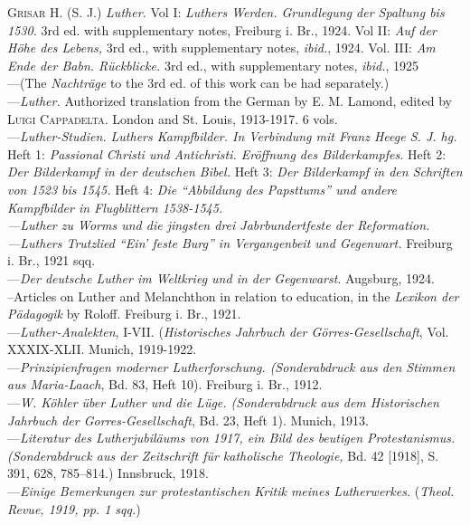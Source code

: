 \textsc{Grisar H.} (S. J.) \textit{Luther.} Vol I: \textit{Luthers Werden. Grundlegung der Spaltung
bis 1530.} 3rd ed. with supplementary notes, Freiburg i. Br., 1924. Vol II:
\textit{Auf der Höhe des Lebens,} 3rd ed., with supplementary notes, \textit{ibid.}, 1924.
Vol. III: \textit{Am Ende der Babn. Rückblicke.} 3rd ed., with supplementary
notes, \textit{ibid.}, 1925 \\
---(The \textit{Nachträge} to the 3rd ed. of this work can be
had separately.) \\
---\textit{Luther.} Authorized translation from the German by E. M. Lamond,
edited by \textsc{Luigi Cappadelta}. London and St. Louis, 1913-1917. 6 vols. \\
---\textit{Luther-Studien. Luthers Kampfbilder. In Verbindung mit Franz Heege
S. J. hg.} \\
Heft 1: \textit{Passional Christi und Antichristi. Eröffnung des Bilderkampfes.}
Heft 2: \textit{Der Bilderkampf in der deutschen Bibel.}
Heft 3: \textit{Der Bilderkampf in den Schriften von 1523 bis 1545.}
Heft 4: \textit{Die “Abbildung des Papsttums” und andere Kampfbilder in Flugblittern 1538-1545. \\
---Luther zu Worms und die jingsten drei Jabrbundertfeste der Reformation. \\
---Luthers Trutzlied “Ein’ feste Burg” in Vergangenbeit und Gegenwart.}
Freiburg i. Br., 1921 sqq. \\
---\textit{Der deutsche Luther im Weltkrieg und in der Gegenwarst}. Augsburg,
1924. \\
--Articles on Luther and Melanchthon in relation to education, in the
\textit{Lexikon der Pädagogik} by Roloff. Freiburg i. Br., 1921. \\
---\textit{Luther-Analekten}, I-VII. (\textit{Historisches Jahrbuch der Görres-Gesellschaft},
Vol. XXXIX-XLII. Munich, 1919-1922. \\
---\textit{Prinzipienfragen moderner Lutherforschung. (Sonderabdruck aus den
Stimmen aus Maria-Laach}, Bd. 83, Heft 10). Freiburg i. Br., 1912. \\
---\textit{W. Köhler über Luther und die Lüge. (Sonderabdruck aus dem Historischen
Jahrbuch der Gorres-Gesellschaft}, Bd. 23, Heft 1). Munich,
1913. \\
---\textit{Literatur des Lutherjubiläums von 1917, ein Bild des beutigen Protestanismus.
(Sonderabdruck aus der Zeitschrift für katholische Theologie,}
Bd. 42 [1918], S. 391, 628, 785--814.) Innsbruck, 1918. \\
---\textit{Einige Bemerkungen zur protestantischen Kritik meines Lutherwerkes.}
(\textit{Theol. Revue, 1919, pp. 1 sqq.}) \\

